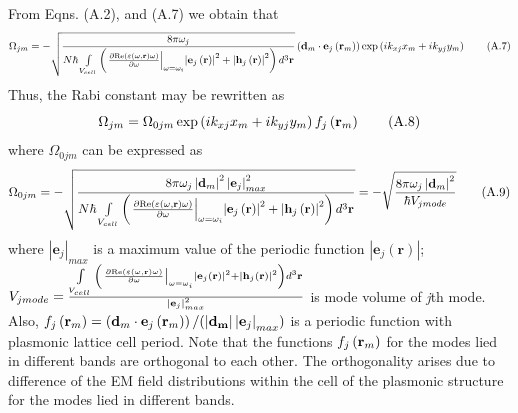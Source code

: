 \documentclass[aps,pra,amsmath,amssymb,onecolumn,superscriptaddress,showpacs,floatfix,]{revtex4-1}
\begin{document}
From Eqns. (A.2), and (A.7) we obtain that
\begin{equation}
{\Omega _{jm}} =-\sqrt{\frac{{8\pi \omega _j}}{{N \hbar} \int\limits_{{V_{cell}}} {\left( {{{\left. {\frac{{\partial {\mathop{\rm Re}\nolimits} \left( {\varepsilon(\omega, \textbf{r}) \omega } \right)}}{{\partial \omega }}} \right|}_{\omega  = {\omega _i}}}{{\left| {{{\bf{e}}_j}\left( {\bf{r}} \right)} \right|}^2} + {{\left| {{{\bf{h}}_j}\left( {\bf{r}} \right)} \right|}^2}} \right){d^3}{\bf{r}}}}} \left( {{{\bf{d}}_m} \cdot {{\bf{e}}_j}\left( {{{\bf{r}}_m}} \right)} \right)\exp \left( {i{k_{xj}}{x_m} + i{k_{yj}}{y_m}} \right) \tag{A.7}
\end{equation}
Thus, the Rabi constant may be rewritten as
\begin{equation}
{\Omega _{jm}} = {\Omega _{0jm}}\exp \left( {i{k_{xj}}{x_m} + i{k_{yj}}{y_m}} \right){f_j}\left( {{{\bf{r}}_m}} \right) \tag{A.8}
\end{equation}
where $\Omega _{0jm}$ can be expressed as
\begin{equation}
{\Omega _{0jm}} =-\sqrt{\frac{{8\pi \omega _j \left|\textbf{d}_m\right|^2 \left|\textbf{e}_{j}\right|_{max}^2}}{{N \hbar} \int\limits_{{V_{cell}}} {\left( {{{\left. {\frac{{\partial {\mathop{\rm Re}\nolimits} \left( {\varepsilon(\omega, \textbf{r}) \omega } \right)}}{{\partial \omega }}} \right|}_{\omega  = {\omega _i}}}{{\left| {{{\bf{e}}_j}\left( {\bf{r}} \right)} \right|}^2} + {{\left| {{{\bf{h}}_j}\left( {\bf{r}} \right)} \right|}^2}} \right){d^3}{\bf{r}}}}} = -\sqrt{\frac{{8\pi \omega _j \left|\textbf{d}_m\right|^2}}{\hbar V_{j mode}}} \tag{A.9}
\end{equation}
where $\left|\textbf{e}_{j}\right|_{max}$ is a maximum value of the periodic function $\left|\textbf{e}_{j}(\textbf{r})\right|$; $V_{j mode}=\frac{\int\limits_{{V_{cell}}} {\left( {{{\left. {\frac{{\partial {\mathop{\rm Re}\nolimits} \left( {\varepsilon(\omega, \textbf{r}) \omega } \right)}}{{\partial \omega }}} \right|}_{\omega  = {\omega _i}}}{{\left| {{{\bf{e}}_j}\left( {\bf{r}} \right)} \right|}^2} + {{\left| {{{\bf{h}}_j}\left( {\bf{r}} \right)} \right|}^2}} \right){d^3}{\bf{r}}}}{\left|\textbf{e}_{j}\right|_{max}^2}$ is mode volume of \textit{j}th mode.
Also, ${f_j}\left( {{{\bf{r}}_m}} \right) = \left( {{{\bf{d}}_m} \cdot {{\bf{e}}_j}\left( {{{\bf{r}}_m}} \right)} \right)/(\left|\bf{d}_m\right| \left|\textbf{e}_{j}\right|_{max})$ is a periodic function with plasmonic lattice cell period. Note that the functions ${f_j}\left( {{{\bf{r}}_m}} \right)$ for the modes lied in different bands are orthogonal to each other. The orthogonality arises due to difference of the EM field distributions within the cell of the plasmonic structure for the modes lied in different bands.
\end{document}
